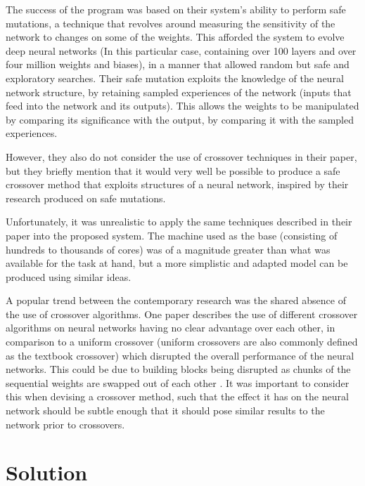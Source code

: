 \documentclass[12pt,a4paper]{article}
\begin{document}
        The success of the program was based on their system's ability to perform safe mutations, a technique that revolves around measuring the sensitivity of the network to changes on some of the weights. \cite{lehman_safe_2017} This afforded the system to evolve deep neural networks (In this particular case, containing over 100 layers and over four million weights and biases), in a manner that allowed random but safe and exploratory searches. Their safe mutation exploits the knowledge of the neural network structure, by retaining sampled experiences of the network (inputs that feed into the network and its outputs). This allows the weights to be manipulated by comparing its significance with the output, by comparing it with the sampled experiences. 

        However, they also do not consider the use of crossover techniques in their paper, but they briefly mention that it would very well be possible to produce a safe crossover method that exploits structures of a neural network, inspired by their research produced on safe mutations.

        Unfortunately, it was unrealistic to apply the same techniques described in their paper into the proposed system. The machine used as the base (consisting of hundreds to thousands of cores) was of a magnitude greater than what was available for the task at hand, but a more simplistic and adapted model can be produced using similar ideas. 
        
        A popular trend between the contemporary research was the shared absence of the use of crossover algorithms. One paper describes the use of different crossover algorithms on neural networks having no clear advantage over each other, in comparison to a uniform crossover (uniform crossovers are also commonly defined as the textbook crossover) which disrupted the overall performance of the neural networks. This could be due to building blocks being disrupted as chunks of the sequential weights are swapped out of each other \cite{emmanouilidis_comparison_2000}. It was important to consider this when devising a crossover method, such that the effect it has on the neural network should be subtle enough that it should pose similar results to the network prior to crossovers.

\section{Solution}
\end{document}
